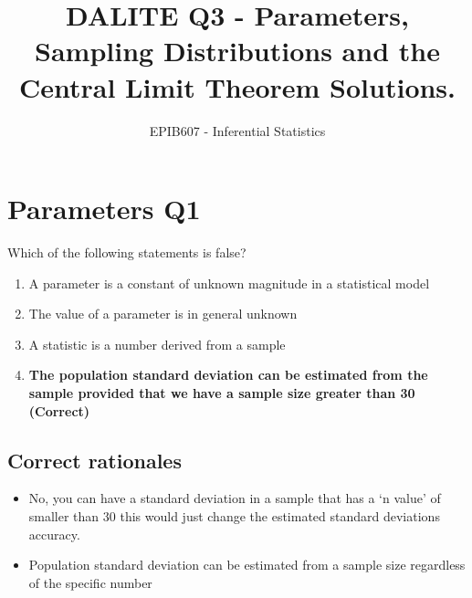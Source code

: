 \documentclass[letterpaper,9pt,twoside,printwatermark=false]{pinp}
\title{DALITE Q3 - Parameters, Sampling Distributions and the Central Limit
Theorem Solutions.}
\author[a]{EPIB607 - Inferential Statistics}
\affil[a]{Fall 2018, McGill University}
\providecommand{\tightlist}{%
  \setlength{\itemsep}{0pt}\setlength{\parskip}{0pt}}
\begin{document}
\verticaladjustment{-2pt}

\maketitle
\thispagestyle{firststyle}



\section{Parameters Q1}\label{parameters-q1}

Which of the following statements is false?

\begin{enumerate}
\def\labelenumi{\alph{enumi})}
\tightlist
\item
  A parameter is a constant of unknown magnitude in a statistical model
\item
  The value of a parameter is in general unknown
\item
  A statistic is a number derived from a sample
\item
  \textbf{The population standard deviation can be estimated from the
  sample provided that we have a sample size greater than 30 (Correct)}
\end{enumerate}

\subsection{Correct rationales}\label{correct-rationales}

\begin{itemize}
\tightlist
\item
  No, you can have a standard deviation in a sample that has a `n value'
  of smaller than 30 this would just change the estimated standard
  deviations accuracy.
\item
  Population standard deviation can be estimated from a sample size
  regardless of the specific number
\end{itemize}
\end{document}
